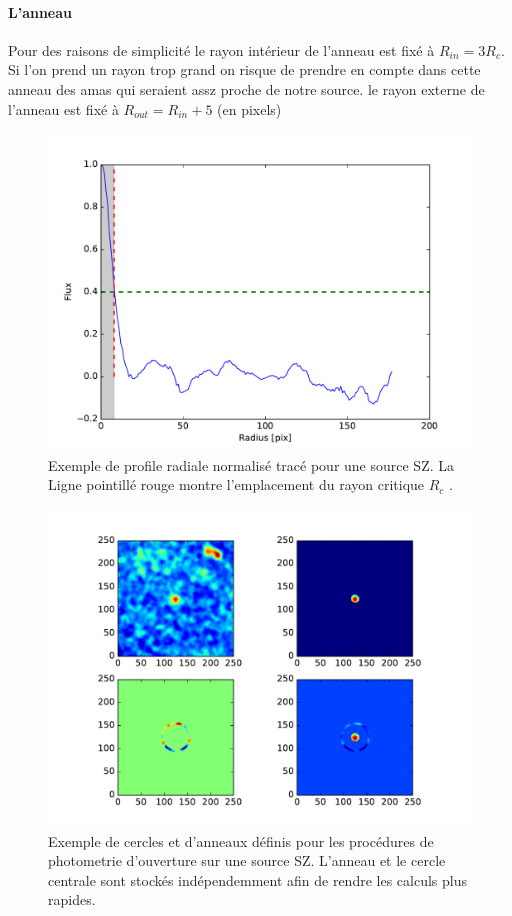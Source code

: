 \documentclass[a4paper,11pt]{article}
\begin{document}
\paragraph{L'anneau} Pour des raisons de simplicité le rayon intérieur de l'anneau 
est fixé à $R_{in} = 3R_c $. Si l'on prend un rayon trop grand on risque de prendre en compte dans cette
anneau des amas qui seraient assz proche de notre source.  le rayon externe de l'anneau est fixé à 
$R_{out} = R_{in} + 5  $ (en pixels)

\begin{figure}[h!]
  \centering
  \label{profile radial}
  \includegraphics[scale = 0.5]{profile_radiale_ama.pdf}
  \caption{Exemple de profile radiale normalisé tracé pour une source SZ. La Ligne pointillé rouge montre 
  l'emplacement du rayon critique $R_c$ .}
\end{figure}

\begin{figure}[h!]
  \centering
  \label{photometrie d'ouverture}
  \includegraphics[scale = 0.8]{exemple_photometrie_d'ouverture.pdf}
  \caption{Exemple de cercles et d'anneaux définis pour les procédures de photometrie d'ouverture sur une source SZ. 
  L'anneau et le cercle centrale sont stockés indépendemment afin de rendre les calculs plus rapides.}
\end{figure}
\end{document}
